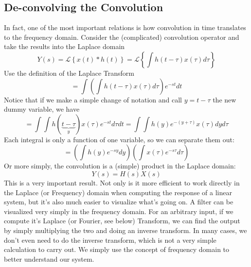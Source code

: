 \subsection{De-convolving the Convolution}
In fact, one of the most important relations is how convolution in time translates to the frequency domain.   Consider the (complicated) convolution operator and take the results into the Laplace domain
    \begin{equation}
        Y(s) = \mathcal{L} \left\{ x(t) * h(t) \right\} = \mathcal{L} \left\{  \int h(t-\tau) x(\tau) d\tau \right\} 
    \end{equation}
Use the definition of the Laplace Transform
    \begin{equation}
        = \int \left( \int h(t-\tau) x(\tau) d\tau \right) e^{-s t} dt
    \end{equation}
Notice that if we make a simple change of notation and call $y = t-\tau$ the new dummy variable, we have
    \begin{equation}
        = \int  \int h(\underbrace{t-\tau}_{y}) x(\tau)  e^{-s t}  d\tau dt =  \int  \int h(y) e^{-(y + \tau)} x(\tau) dy d\tau
    \end{equation}
Each integral is only a function of one variable, so we can separate them out:
    \begin{equation}
        = \left( \int h(y) e^{-sy} dy  \right) \left( \int x(\tau) e^{-s \tau} d\tau \right) 
    \end{equation}
 Or more simply, the convolution is a (simple) product in the Laplace domain:
    \begin{equation}
        Y(s) = H(s) X(s) 
    \end{equation}
This is a very important result.  Not only is it more efficient to work directly in the Laplace (or Frequency) domain when computing the response of a linear system, but it's also much easier to visualize what's going on.  A filter can be visualized very simply in the frequency domain. For an arbitrary input, if we compute it's Laplace (or Fourier, see below) Transform, we can find the output by simply multiplying the two and doing an inverse transform.  In many cases, we don't even need to do the inverse transform, which is not a very simple calculation to carry out.  We simply use the concept of frequency domain to better understand our system.
